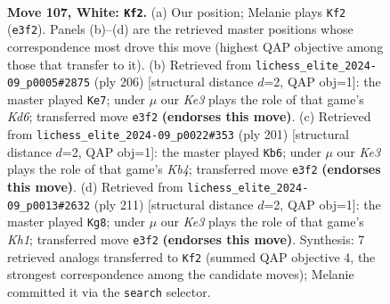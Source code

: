 \documentclass[11pt]{article}
\begin{document}
\clearpage

\begin{figure}[p]\centering
\begin{subfigure}{0.46\textwidth}\centering
\resizebox{\linewidth}{!}{%
\newchessgame
\chessboard[
  setfen={5k2/8/7R/8/6R1/4K3/8/8 w - - 7 107},
  showmover=false,
  pgfstyle=straightmove, color=movearrow, markmove={e3-f2}
]}
\caption{}
\end{subfigure}\hfill
\begin{subfigure}{0.46\textwidth}\centering
\resizebox{\linewidth}{!}{%
\newchessgame
\chessboard[
  setfen={6k1/8/3K4/5R2/8/8/8/8 w - - 17 104},
  showmover=false,
  pgfstyle=straightmove, color=movearrow, markmove={d6-e7}
]}
\caption{}
\end{subfigure}
\\[4pt]
\begin{subfigure}{0.46\textwidth}\centering
\resizebox{\linewidth}{!}{%
\newchessgame
\chessboard[
  setfen={1K6/8/8/1k6/8/8/2r5/8 b - - 19 101},
  showmover=false,
  pgfstyle=straightmove, color=movearrow, markmove={b5-b6}
]}
\caption{}
\end{subfigure}\hfill
\begin{subfigure}{0.46\textwidth}\centering
\resizebox{\linewidth}{!}{%
\newchessgame
\chessboard[
  setfen={7k/5r2/8/8/6K1/8/8/8 b - - 7 106},
  showmover=false,
  pgfstyle=straightmove, color=movearrow, markmove={h8-g8}
]}
\caption{}
\end{subfigure}
\caption{\textbf{Move 107, White: \texttt{Kf2}.} (a) Our position; Melanie plays \texttt{Kf2} (\texttt{e3f2}). Panels (b)--(d) are the retrieved master positions whose correspondence most drove this move (highest QAP objective among those that transfer to it). (b) Retrieved from \texttt{lichess\_elite\_2024-09\_p0005\#2875} (ply 206) [structural distance $d$=2, QAP obj=1]: the master played \texttt{Ke7}; under $\mu$ our \emph{Ke3} plays the role of that game's \emph{Kd6}; transferred move \texttt{e3f2} \textbf{(endorses this move)}. (c) Retrieved from \texttt{lichess\_elite\_2024-09\_p0022\#353} (ply 201) [structural distance $d$=2, QAP obj=1]: the master played \texttt{Kb6}; under $\mu$ our \emph{Ke3} plays the role of that game's \emph{Kb4}; transferred move \texttt{e3f2} \textbf{(endorses this move)}. (d) Retrieved from \texttt{lichess\_elite\_2024-09\_p0013\#2632} (ply 211) [structural distance $d$=2, QAP obj=1]: the master played \texttt{Kg8}; under $\mu$ our \emph{Ke3} plays the role of that game's \emph{Kh1}; transferred move \texttt{e3f2} \textbf{(endorses this move)}. Synthesis: 7 retrieved analogs transferred to \texttt{Kf2} (summed QAP objective 4, the strongest correspondence among the candidate moves); Melanie committed it via the \texttt{search} selector.}
\label{fig:thought-m212}
\end{figure}
\end{document}
